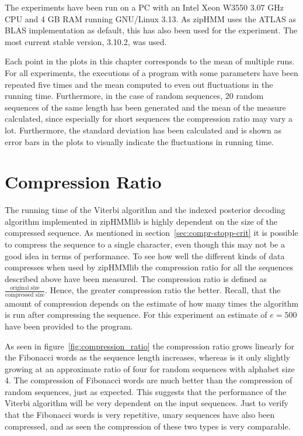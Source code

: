 The experiments have been run on a PC with an Intel Xeon W3550 $3.07$ GHz CPU
and 4 GB RAM running GNU/Linux 3.13. As zipHMM uses the ATLAS as BLAS
implementation as default, this has also been used for the experiment. The most
current stable version, 3.10.2, was used.

Each point in the plots in this chapter corresponds to the mean of multiple
runs. For all experiments, the executions of a program with some parameters
have been repeated five times and the mean computed to even out fluctuations in
the running time. Furthermore, in the case of random sequences, 20 random
sequences of the same length has been generated and the mean of the measure
calculated, since especially for short sequences the compression ratio may vary
a lot. Furthermore, the standard deviation has been calculated and is shown as
error bars in the plots to visually indicate the fluctuations in running time.

\section{Compression Ratio} 
\label{sec:compression-ratio}

The running time of the Viterbi algorithm and the indexed posterior decoding
algorithm implemented in zipHMMlib is highly 
dependent on the size of the compressed sequence. As mentioned in
section~\ref{sec:compr-stopp-crit} it is possible to compress the sequence to a
single character, even though this may not be a good idea in terms of
performance. To see how well the different kinds of data compresses when used
by zipHMMlib the compression ratio for all the sequences described above have
been measured. The compression ratio is defined as
$\frac{\text{original size}}{\text{compressed size}}$. Hence, the greater
compression ratio the better. Recall, that the amount of compression depends on
the estimate of how many times the algorithm is run after compressing the
sequence. For this experiment an estimate of $e = 500$ have been provided to
the program.

As seen in figure~\ref{fig:compression_ratio} the compression ratio grows
linearly for the Fibonacci words as the sequence length increases, whereas is
it only slightly growing at an approximate ratio of four for random
sequences with alphabet size 4. The compression of Fibonacci words are much
better than the compression of random sequences, just as expected. This
suggests that the performance of the Viterbi algorithm will be very dependent
on the input sequences. Just to verify that the Fibonacci words is very
repetitive, unary sequences have also been compressed, and as seen the
compression of these two types is very comparable.

